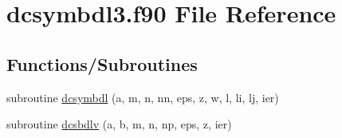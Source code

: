 \hypertarget{dcsymbdl3_8f90}{\section{dcsymbdl3.\-f90 File Reference}
\label{dcsymbdl3_8f90}
}
\subsection*{Functions/\-Subroutines}
\begin{DoxyCompactItemize}
\item 
subroutine \hyperlink{dcsymbdl3_8f90_aeeee770e68c38f2aa421e33c3beb99ae}{dcsymbdl} (a, m, n, nn, eps, z, w, l, li, lj, ier)
\item 
subroutine \hyperlink{dcsymbdl3_8f90_a7040911526102a3b45b6d558a319aa11}{dcsbdlv} (a, b, m, n, np, eps, z, ier)
\end{DoxyCompactItemize}



